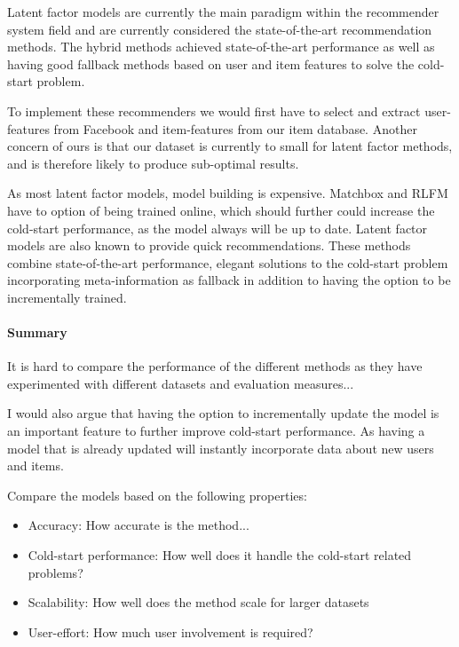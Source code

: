 Latent factor models are currently the main paradigm within the recommender
system field and are currently considered the state-of-the-art recommendation
methods. The hybrid methods achieved state-of-the-art performance as well as
having good fallback methods based on user and item features to solve the
cold-start problem.


To implement these recommenders we would first have to select and extract
user-features from Facebook and item-features from our item database. Another
concern of ours is that our dataset is currently to small for latent factor
methods, and is therefore likely to produce sub-optimal results.

As most latent factor models, model building is expensive. Matchbox and RLFM
have to option of being trained online, which should further could increase the
cold-start performance, as the model always will be up to date. Latent factor
models are also known to provide quick recommendations. These methods combine
state-of-the-art performance, elegant solutions to the cold-start problem
incorporating meta-information as fallback in addition to having the option to
be incrementally trained.

\paragraph{Summary}


It is hard to compare the performance of the different methods as they have
experimented with different datasets and evaluation measures...

I would also argue that having the option to incrementally update the model is
an important feature to further improve cold-start performance. As having a
model that is already updated will instantly incorporate data about new users
and items.

Compare the models based on the following properties:

\begin{itemize}
	\item Accuracy: How accurate is the method...
	\item Cold-start performance: How well does it handle the cold-start related problems?
	\item Scalability: How well does the method scale for larger datasets
	\item User-effort: How much user involvement is required?
\end{itemize}

